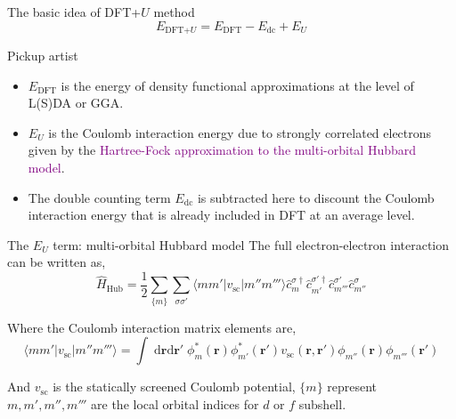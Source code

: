\documentclass{beamer}
\newcommand{\purple}{\textcolor{purple}}
\begin{document}
  \begin{frame}{The basic idea of DFT+\(U\) method}
    \begin{equation}
      E_{\text{DFT+}U} = E_{\text{DFT}} - E_{\text{dc}} + E_{U}
    \end{equation}

    \begin{block}{Pickup artist}
      \begin{itemize}
        \item \(E_{\text{DFT}}\) is the energy of density functional approximations at the level of L(S)DA or GGA.
        \item \(E_{U}\) is the Coulomb interaction energy due to strongly correlated electrons given by the \purple{Hartree-Fock approximation to the multi-orbital Hubbard model}.
        \item The double counting term \(E_{\text{dc}}\) is subtracted here to discount the Coulomb interaction energy that is already included in DFT at an average level.
      \end{itemize}
    \end{block}
  \end{frame}

  \begin{frame}{The \(E_U\) term: multi-orbital Hubbard model}
    The full electron-electron interaction can be written as,
    \begin{equation}
      \hat{H}_{\text{Hub}} = \frac{1}{2}\sum_{\{m\}}\sum_{\sigma{}\sigma'}\langle{}mm'|v_{\text{sc}}|m''m'''\rangle\hat{c}_{m}^{\sigma{}\dagger}\hat{c}_{m'}^{\sigma'{}\dagger}\hat{c}_{m'''}^{\sigma'}\hat{c}_{m''}^{\sigma}
    \end{equation}

    Where the Coulomb interaction matrix elements are,
    \begin{equation}
      \langle{}mm'|v_{\text{sc}}|m''m'''\rangle = \int\;\mathrm{d}\bm{r}\mathrm{d}\bm{r'}\; \phi_m^*(\bm{r})\phi_{m'}^*(\bm{r'})v_{\text{sc}}(\bm{r}, \bm{r'})\phi_{m''}(\bm{r})\phi_{m'''}(\bm{r'})
    \end{equation}
    
    And \(v_{\text{sc}}\) is the statically screened Coulomb potential, \(\{m\}\) represent \(m,m',m'',m'''\) are the local orbital indices for \(d\) or \(f\) subshell.
  \end{frame}
\end{document}
